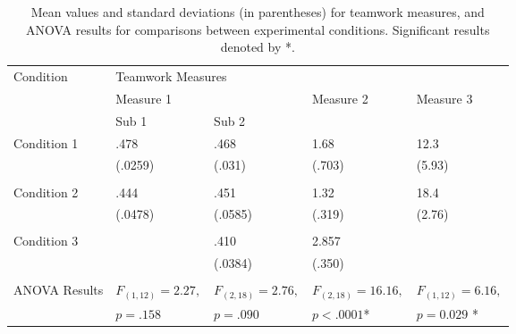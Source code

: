 \begin{center}
\begin{table*}[htbp!]
\small
\begin{center}
\begin{tabular}{l l l l l}
\toprule
Condition & \multicolumn{4}{l}{Teamwork Measures}\\
\cmidrule(r){2-5}
& \multicolumn{2}{l}{Measure 1} & Measure 2 & Measure 3 \\
\cmidrule(r){2-3} 
&  Sub 1 & Sub 2 &  \\ 


\midrule


Condition 1 & .478 & .468 & 1.68 & 12.3  \\
                  & (.0259) & (.031) & (.703) & (5.93) \\
\\

Condition 2 & .444 & .451 & 1.32 & 18.4 \\
                              & (.0478) & (.0585) & (.319) & (2.76) \\
\\

Condition 3 &  & .410 &  2.857 &  \\
                     &        & (.0384)  & (.350) & \\
\\


ANOVA Results & $F_{(1,12)} = 2.27,$ & $F_{(2,18)} = 2.76,$  & $F_{(2,18)} = 16.16,$ & $F_{(1,12)} = 6.16,$ \\
                          & $p = .158$ & $p = .090  $ &  $p < .0001$* &  $p = 0.029$ * \\
\bottomrule
\end{tabular}

\caption[a]{Mean values and standard deviations (in parentheses) for teamwork measures, and ANOVA results for comparisons between experimental conditions. Significant results denoted by *.}
\label{tab:exampletable}
\end{center}
\end{table*}
\end{center}